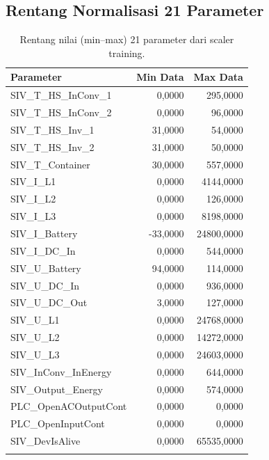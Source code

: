 \documentclass[11pt,a4paper]{article}
\begin{document}
\subsection{Rentang Normalisasi 21 Parameter}
\begin{longtable}{lrr}
    \toprule
    \textbf{Parameter} & \textbf{Min Data} & \textbf{Max Data} \\
    \midrule
    \endhead
    SIV\_T\_HS\_InConv\_1   & 0,0000   & 295,0000 \\
    SIV\_T\_HS\_InConv\_2   & 0,0000   & 96,0000 \\
    SIV\_T\_HS\_Inv\_1      & 31,0000  & 54,0000 \\
    SIV\_T\_HS\_Inv\_2      & 31,0000  & 50,0000 \\
    SIV\_T\_Container       & 30,0000  & 557,0000 \\
    SIV\_I\_L1              & 0,0000   & 4144,0000 \\
    SIV\_I\_L2              & 0,0000   & 126,0000 \\
    SIV\_I\_L3              & 0,0000   & 8198,0000 \\
    SIV\_I\_Battery         & -33,0000 & 24800,0000 \\
    SIV\_I\_DC\_In          & 0,0000   & 544,0000 \\
    SIV\_U\_Battery         & 94,0000  & 114,0000 \\
    SIV\_U\_DC\_In          & 0,0000   & 936,0000 \\
    SIV\_U\_DC\_Out         & 3,0000   & 127,0000 \\
    SIV\_U\_L1              & 0,0000   & 24768,0000 \\
    SIV\_U\_L2              & 0,0000   & 14272,0000 \\
    SIV\_U\_L3              & 0,0000   & 24603,0000 \\
    SIV\_InConv\_InEnergy   & 0,0000   & 644,0000 \\
    SIV\_Output\_Energy     & 0,0000   & 574,0000 \\
    PLC\_OpenACOutputCont   & 0,0000   & 0,0000 \\
    PLC\_OpenInputCont      & 0,0000   & 0,0000 \\
    SIV\_DevIsAlive         & 0,0000   & 65535,0000 \\
    \bottomrule
    \caption{Rentang nilai (min--max) 21 parameter dari scaler training.}
    \label{tab:minmax}
\end{longtable}
\end{document}
